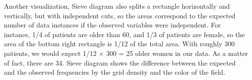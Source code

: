 Another visualization, Sieve diagram also splits a rectangle horizontally and vertically, but with independent cuts, so the areas correspond to the expected number of data instances if the observed variables were independent. For instance, 1/4 of patients are older than 60, and 1/3 of patients are female, so the area of the bottom right rectangle is 1/12 of the total area. With roughly 300 patients, we would expect 1/12 × 300 = 25 older women in our data. As a matter of fact, there are 34. Sieve diagram shows the difference between the expected and the observed frequencies by the grid density and the color of the field.
